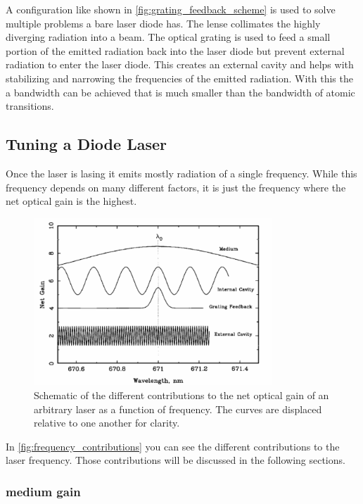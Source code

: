 A configuration like shown in \autoref{fig:grating_feedback_scheme} is used to solve multiple problems a bare laser diode has.
The lense collimates the highly diverging radiation into a beam.
The optical grating is used to feed a small portion of the emitted radiation back into the laser diode but prevent external radiation to enter the laser diode.
This creates an external cavity and helps with stabilizing and narrowing the frequencies of the emitted radiation.
With this the a bandwidth can be achieved that is much smaller than the bandwidth of atomic transitions.


\subsection{Tuning a Diode Laser}
\label{ssec:laser_tuning}

Once the laser is lasing it emits mostly radiation of a single frequency.
While this frequency depends on many different factors, it is just the frequency where the net optical gain is the highest.

\begin{figure}
    \centering
    \includegraphics[width=0.8\textwidth]{images/frequency_contributions.png}
    \caption{Schematic of the different contributions to the net optical gain of an arbitrary laser as a
    function of frequency. The curves are displaced relative to one another for clarity. \cite{V60}}
    \label{fig:frequency_contributions}
\end{figure}

In \autoref{fig:frequency_contributions} you can see the different contributions to the laser frequency.
Those contributions will be discussed in the following sections.

\subsubsection{medium gain}
\label{sssec:medium_gain}

